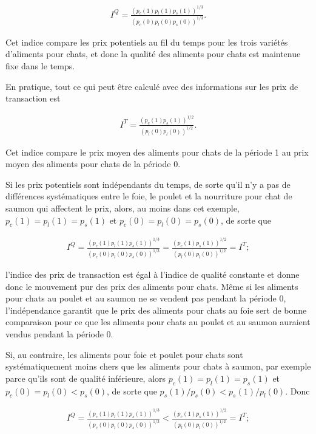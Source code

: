 \documentclass[
]{article}
\begin{document}
\begin{align*}
I^{Q} = \frac{(p_{c}(1)p_{l}(1)p_{s}(1))^{1/3}}{(p_{c}(0)p_{ l}(0)p_{s}(0))^{1/3}}.
\end{align*}

Cet indice compare les prix potentiels au fil du temps pour les trois variétés d'aliments pour chats, et donc la qualité des aliments pour chats est maintenue fixe dans le temps.

En pratique, tout ce qui peut être calculé avec des informations sur les prix de transaction est

\begin{align*}
I^{T} = \frac{(p_{c}(1)p_{s}(1))^{1/2}}{(p_{l}(0)p_{l}(0))^{1/2}}.
\end{align*}

Cet indice compare le prix moyen des aliments pour chats de la période 1 au prix moyen des aliments pour chats de la période 0.

Si les prix potentiels sont indépendants du temps, de sorte qu'il n'y a pas de différences systématiques entre le foie, le poulet et la nourriture pour chat de saumon qui affectent le prix, alors, au moins dans cet exemple, \(p_{c}(1)= p_{l}(1) = p_{s}(1)\) et \(p_{c}(0)= p_{l}(0)= p_{s}(0)\), de sorte que

\begin{align*}
I^{Q} = \frac{(p_{c}(1)p_{l}(1)p_{s}(1))^{1/3}}{(p_{c}(0)p_{ l}(0)p_{s}(0))^{1/3}} = \frac{(p_{c}(1)p_{s}(1))^{1/2}}{(p_{l}(0)p_{l}(0))^{1/2}} = I^{T};
\end{align*}

l'indice des prix de transaction est égal à l'indice de qualité constante et donne donc le mouvement pur des prix des aliments pour chats. Même si les aliments pour chats au poulet et au saumon ne se vendent pas pendant la période 0, l'indépendance garantit que le prix des aliments pour chats au foie sert de bonne comparaison pour ce que les aliments pour chats au poulet et au saumon auraient vendus pendant la période 0.

Si, au contraire, les aliments pour foie et poulet pour chats sont systématiquement moins chers que les aliments pour chats à saumon, par exemple parce qu'ils sont de qualité inférieure, alors \(p_{c}(1)= p_{l}(1)= p_{s}(1)\) et \(p_{c}(0)= p_{l}(0)<p_{s}(0)\), de sorte que \(p_{s}(1)/ p_{s}(0)<p_{s }(1)/ p_{l}(0)\). Donc

\begin{align*}
I^{Q} = \frac{(p_{c}(1)p_{l}(1)p_{s}(1))^{1/3}}{(p_{c}(0)p_{ l}(0)p_{s}(0))^{1/3}} <\frac{(p_{c}(1)p_{s}(1))^{1/2}}{(p_{l}(0)p_{l}(0))^{1/2}} = I^{T};
\end{align*}
\end{document}
